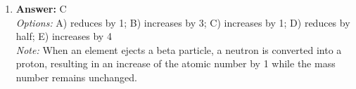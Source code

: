 \documentclass[12pt]{article}
\begin{document}
\begin{enumerate}[label=\arabic*.]
\\ \textit{Options:} A) 1000 times more; B) 50 times more; C) 5000 times more; D) 500 times more; E) 10000 times more
\\ \textit{Note:} The telescope can gather light based on the area of its aperture compared to the area of the pupil, and since the area of a circle is proportional to the square of its diameter, the ratio of the light-gathering capability is (50 cm / 0.5 cm)² = 10000, indicating the telescope gathers 10,000 times more light than the eye.
\item \textbf{Answer:} C
\\ \textit{Options:} A) reduces by 1; B) increases by 3; C) increases by 1; D) reduces by half; E) increases by 4
\\ \textit{Note:} When an element ejects a beta particle, a neutron is converted into a proton, resulting in an increase of the atomic number by 1 while the mass number remains unchanged.
\end{enumerate}
\end{document}
